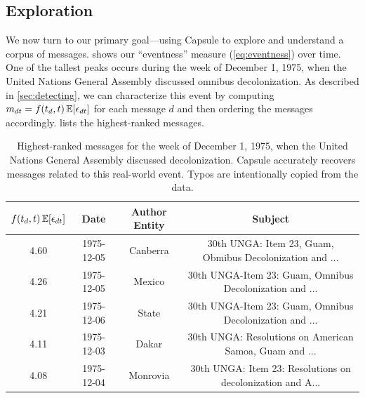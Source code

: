 \subsection{Exploration}

We now turn to our primary goal---using Capsule to explore and
understand a corpus of messages.  shows our
``eventness'' measure (\cref{eq:eventness}) over time. One of the
tallest peaks occurs during the week of December 1, 1975, when the
United Nations General Assembly discussed omnibus decolonization. As
described in \cref{sec:detecting}, we can characterize this event by
computing $m_{dt} = f(t_d, t)\,\mathbb{E}[\epsilon_{dt}]$ for each message $d$
and then ordering the messages accordingly.  lists the
highest-ranked messages.

\begin{table}[tb]
\small
\centering
\begin{tabular}{cccc}
\toprule
$f(t_d, t)\, \mathbb{E}[\epsilon_{dt}]$ & \textbf{Date} & \textbf{Author Entity} & \textbf{Subject} \\
\midrule
4.60 & 1975-12-05 & Canberra & 30th UNGA: Item 23, Guam, Obmibus Decolonization and ... \\
4.26 & 1975-12-05 & Mexico & 30th UNGA-Item 23: Guam, Omnibus Decolonization and ... \\
4.21 & 1975-12-06 & State & 30th UNGA-Item 23: Guam, Omnibus Decolonization and ... \\
4.11 & 1975-12-03 & Dakar & 30th UNGA: Resolutions on American Samoa, Guam and ...\\
4.08 & 1975-12-04 & Monrovia & 30th UNGA: Item 23: Resolutions on decolonization and A...\\
\bottomrule
\end{tabular}
\caption{Highest-ranked messages for the week of December 1, 1975,
  when the United Nations General Assembly discussed
  decolonization. Capsule accurately recovers messages related to this
  real-world event. Typos are intentionally copied from the data.}
\label{tab:decol}
\end{table}

